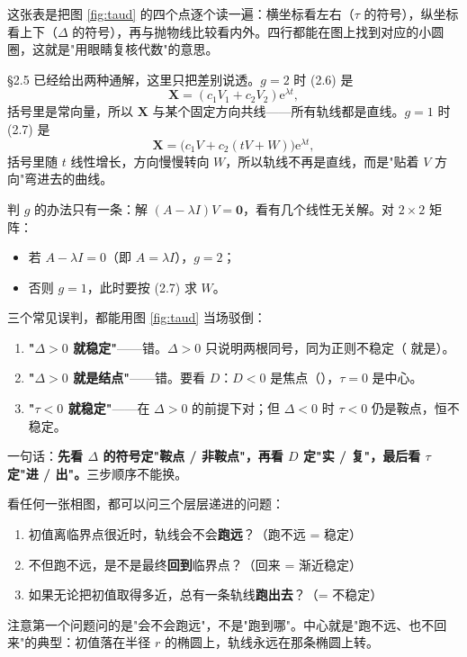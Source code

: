 \documentclass[11pt]{ctexart}
\newcommand{\X}{\mathbf{X}}\newcommand{\Y}{\mathbf{Y}}
\newcommand{\cnum}[1]{\ding{\the\numexpr171+#1\relax}}
\begin{document}
这张表是把图 \ref{fig:taud} 的四个点逐个读一遍：横坐标看左右（$\tau$ 的符号），纵坐标看上下（$\Delta$ 的符号），再与抛物线比较看内外。四行都能在图上找到对应的小圆圈，这就是"用眼睛复核代数"的意思。


§2.5 已经给出两种通解，这里只把差别说透。$g=2$ 时 (2.6) 是
\[
\X=(c_1V_1+c_2V_2)\mathrm{e}^{\lambda t},
\]
括号里是常向量，所以 $\X$ 与某个固定方向共线——所有轨线都是直线。$g=1$ 时 (2.7) 是
\[
\X=\big(c_1V+c_2(tV+W)\big)\mathrm{e}^{\lambda t},
\]
括号里随 $t$ 线性增长，方向慢慢转向 $W$，所以轨线不再是直线，而是"贴着 $V$ 方向"弯进去的曲线。

判 $g$ 的办法只有一条：解 $(A-\lambda I)V=\mathbf{0}$，看有几个线性无关解。对 $2\times2$ 矩阵：
\begin{itemize}
\item 若 $A-\lambda I=0$（即 $A=\lambda I$），$g=2$；
\item 否则 $g=1$，此时要按 (2.7) 求 $W$。
\end{itemize}


三个常见误判，都能用图 \ref{fig:taud} 当场驳倒：
\begin{enumerate}
\item \textbf{"$\Delta>0$ 就稳定"}——错。$\Delta>0$ 只说明两根同号，同为正则不稳定（\cnum{1}\cnum{4} 就是）。
\item \textbf{"$\Delta>0$ 就是结点"}——错。要看 $D$：$D<0$ 是焦点（\cnum{3}），$\tau=0$ 是中心。
\item \textbf{"$\tau<0$ 就稳定"}——在 $\Delta>0$ 的前提下对；但 $\Delta<0$ 时 $\tau<0$ 仍是鞍点，恒不稳定。
\end{enumerate}
一句话：\textbf{先看 $\Delta$ 的符号定"鞍点 / 非鞍点"，再看 $D$ 定"实 / 复"，最后看 $\tau$ 定"进 / 出"。}三步顺序不能换。



看任何一张相图，都可以问三个层层递进的问题：
\begin{enumerate}
\item 初值离临界点很近时，轨线会不会\textbf{跑远}？（跑不远 = 稳定）
\item 不但跑不远，是不是最终\textbf{回到}临界点？（回来 = 渐近稳定）
\item 如果无论把初值取得多近，总有一条轨线\textbf{跑出去}？（= 不稳定）
\end{enumerate}
注意第一个问题问的是"会不会跑远"，不是"跑到哪"。中心就是"跑不远、也不回来"的典型：初值落在半径 $r$ 的椭圆上，轨线永远在那条椭圆上转。
\end{document}
